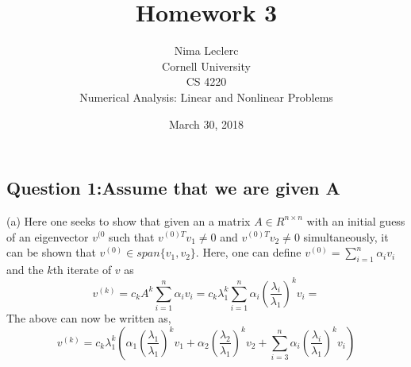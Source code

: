 \documentclass{article}
\begin{document}
 
\title{\bf{Homework 3}}

\author{Nima Leclerc\\Cornell University\\CS 4220 \\ Numerical Analysis: Linear and Nonlinear Problems}
\date{March 30, 2018}
\maketitle
\newpage   
\subsection*{Question 1:Assume that we are given A  } 
(a) Here one seeks to show that given an a matrix $A \in R^{n \times n}$  with an initial guess of an eigenvector $v^{(0}$ such that $v^{(0)T}v_{1} \neq 0$  and 
$v^{(0)T}v_{2} \neq 0$ simultaneously, it can be shown that  $v^(0) \in span \{  v_{1}, v_{2} \} $.  \newline 
Here, one can define $v^{(0)} =\sum_{i=1}^{n}\alpha_{i}v_{i}$  and the $k$th iterate of $v$ as  
$$v^{(k)} =c_{k}A^{k}\sum_{i=1}^{n}\alpha_{i}v_{i}   = c_{k}\lambda_{1}^{k}\sum_{i=1}^{n}\alpha_{i}(\frac{\lambda_{i}}{\lambda_{1}})^{k} v_{i}  =  $$ 
The above can now be written as, 
$$v^{(k)} = c_{k}\lambda_{1}^{k}(\alpha_{1}(\frac{\lambda_{1}}{\lambda_{1}})^{k} v_{1} +   \alpha_{2}(\frac{\lambda_{2}}{\lambda_{1}})^{k} v_{2} +  \sum_{i=3}^{n}\alpha_{i}(\frac{\lambda_{i}}{\lambda_{1}})^{k} v_{i} ) $$ 
\end{document}
